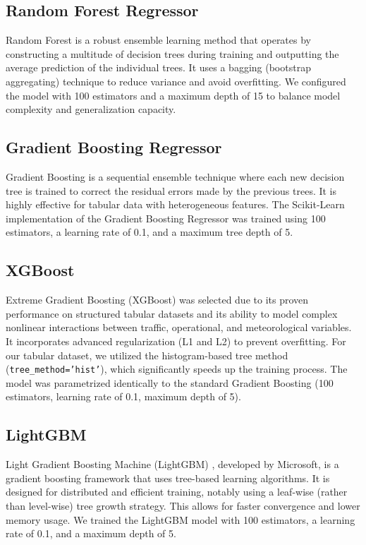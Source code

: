 \subsection{Random Forest Regressor}
Random Forest \cite{breiman2001random} is a robust ensemble learning method that operates by constructing a multitude of decision trees during training and outputting the average prediction of the individual trees. It uses a bagging (bootstrap aggregating) technique to reduce variance and avoid overfitting. We configured the model with 100 estimators and a maximum depth of 15 to balance model complexity and generalization capacity.

\subsection{Gradient Boosting Regressor}
Gradient Boosting \cite{friedman2001greedy} is a sequential ensemble technique where each new decision tree is trained to correct the residual errors made by the previous trees. It is highly effective for tabular data with heterogeneous features. The Scikit-Learn implementation of the Gradient Boosting Regressor was trained using 100 estimators, a learning rate of 0.1, and a maximum tree depth of 5.

\subsection{XGBoost}
Extreme Gradient Boosting (XGBoost) \cite{chen2016xgboost} was selected due to its proven performance on structured tabular datasets and its ability to model complex nonlinear interactions between traffic, operational, and meteorological variables. It incorporates advanced regularization (L1 and L2) to prevent overfitting. For our tabular dataset, we utilized the histogram-based tree method (\texttt{tree\_method='hist'}), which significantly speeds up the training process. The model was parametrized identically to the standard Gradient Boosting (100 estimators, learning rate of 0.1, maximum depth of 5).

\subsection{LightGBM}
Light Gradient Boosting Machine (LightGBM) \cite{ke2017lightgbm}, developed by Microsoft, is a gradient boosting framework that uses tree-based learning algorithms. It is designed for distributed and efficient training, notably using a leaf-wise (rather than level-wise) tree growth strategy. This allows for faster convergence and lower memory usage. We trained the LightGBM model with 100 estimators, a learning rate of 0.1, and a maximum depth of 5.

